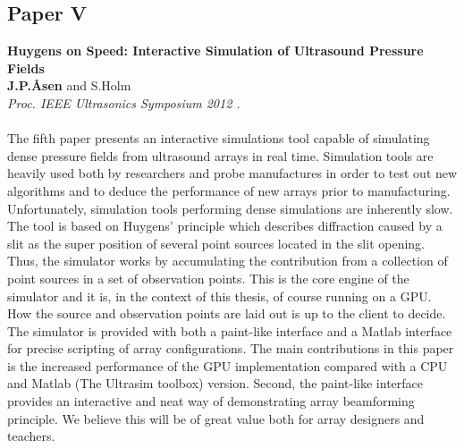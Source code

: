 \subsection{Paper V}
\textbf{Huygens on Speed: Interactive Simulation of Ultrasound Pressure Fields}\\
\textbf{J.\:P.\:\AA{}sen} and S.\:Holm\\
{\it Proc. IEEE Ultrasonics Symposium 2012 .}\\\\
The fifth paper presents an interactive simulations tool capable of simulating dense pressure fields from ultrasound arrays in real time. Simulation tools are heavily used both by researchers and probe manufactures in order to test out new algorithms and to deduce the performance of new arrays prior to manufacturing. Unfortunately, simulation tools performing dense simulations are inherently slow. The tool is based on Huygens' principle which describes diffraction caused by a slit as the super position of several point sources located in the slit opening. Thus, the simulator works by accumulating the contribution from a collection of point sources in a set of observation points. This is the core engine of the simulator and it is, in the context of this thesis, of course running on a GPU. How the source and observation points are laid out is up to the client to decide. The simulator is provided with both a paint-like interface and a Matlab interface for precise scripting of array configurations. The main contributions in this paper is the increased performance of the GPU implementation compared with a CPU and Matlab (The Ultrasim toolbox) version. Second, the paint-like interface provides an interactive and neat way of demonstrating array beamforming principle. We believe this will be of great value both for array designers and teachers.

